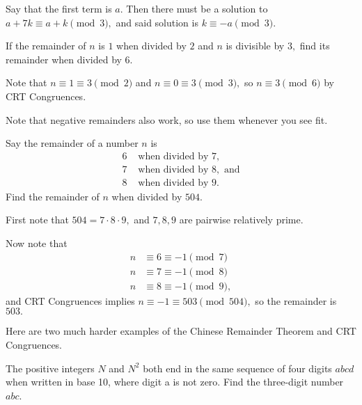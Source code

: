 \documentclass[mast]{lucky}
\begin{document}
\begin{sol}
Say that the first term is $a.$ Then there must be a solution to $a+7k\equiv a+k\pmod{3},$ and said solution is $k\equiv -a\pmod{3}.$
\end{sol}

\begin{exam}
If the remainder of $n$ is $1$ when divided by $2$ and $n$ is divisible by $3,$ find its remainder when divided by $6.$
\end{exam}

\begin{sol}
Note that $n\equiv 1\equiv 3\pmod{2}$ and $n\equiv 0\equiv 3\pmod{3},$ so $n\equiv3\pmod{6}$ by CRT Congruences.
\end{sol}

Note that negative remainders also work, so use them whenever you see fit.

\begin{exam}
Say the remainder of a number $n$ is
\begin{align*}
6 &\text{ when divided by } 7, \\
7 &\text{ when divided by } 8, \text{ and}\\
8 &\text{ when divided by } 9.
\end{align*}
Find the remainder of $n$ when divided by $504.$
\end{exam}

\begin{sol}
First note that $504=7\cdot 8\cdot 9,$ and $7,8,9$ are pairwise relatively prime.

Now note that
\begin{align*}
n&\equiv 6\equiv -1\pmod{7} \\
n&\equiv 7\equiv -1\pmod{8} \\
n&\equiv 8\equiv -1\pmod{9},
\end{align*}
and CRT Congruences implies $n\equiv -1\equiv 503\pmod{504},$ so the remainder is $503.$
\end{sol}

Here are two much harder examples of the Chinese Remainder Theorem and CRT Congruences.

\begin{exam}[AIME I 2014/8]
The positive integers $N$ and $N^2$ both end in the same sequence of four digits $abcd$ when written in base 10, where digit a is not zero. Find the three-digit number $abc$.
\end{exam}
\end{document}
